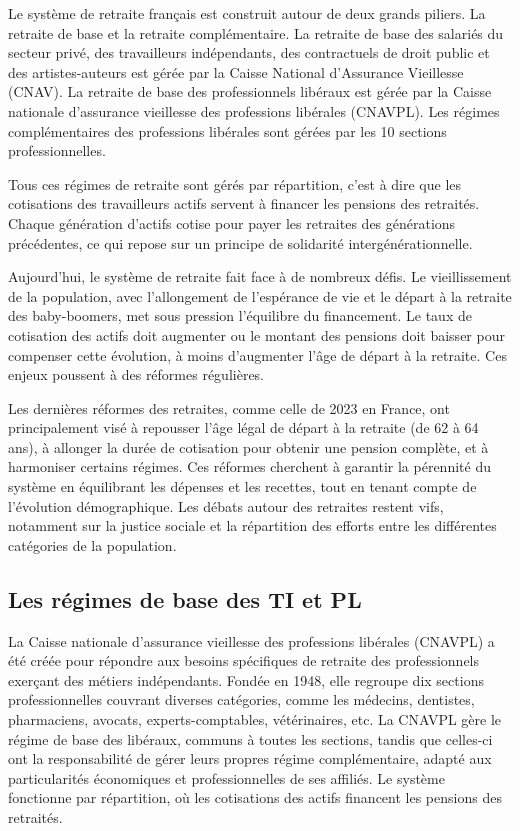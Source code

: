 Le système de retraite français est construit autour de deux grands piliers.
La retraite de base et la retraite complémentaire.
La retraite de base des salariés du secteur privé, des travailleurs indépendants, des contractuels de droit public et des artistes-auteurs est gérée par la Caisse National d'Assurance Vieillesse (CNAV). La retraite de base des professionnels libéraux est gérée par la Caisse nationale d'assurance vieillesse des professions libérales (CNAVPL).
Les régimes complémentaires des professions libérales sont gérées par les 10 sections professionnelles.

Tous ces régimes de retraite sont gérés par répartition, c'est à dire que les cotisations des travailleurs actifs servent à financer les pensions des retraités. Chaque génération d'actifs cotise pour payer les retraites des générations précédentes, ce qui repose sur un principe de solidarité intergénérationnelle. 

Aujourd'hui, le système de retraite fait face à de nombreux défis. Le vieillissement de la population, avec l'allongement de l'espérance de vie et le départ à la retraite des baby-boomers, met sous pression l'équilibre du financement. Le taux de cotisation des actifs doit augmenter ou le montant des pensions doit baisser pour compenser cette évolution, à moins d'augmenter l'âge de départ à la retraite. Ces enjeux poussent à des réformes régulières.

Les dernières réformes des retraites, comme celle de 2023 en France, ont principalement visé à repousser l'âge légal de départ à la retraite (de 62 à 64 ans), à allonger la durée de cotisation pour obtenir une pension complète, et à harmoniser certains régimes. Ces réformes cherchent à garantir la pérennité du système en équilibrant les dépenses et les recettes, tout en tenant compte de l'évolution démographique. Les débats autour des retraites restent vifs, notamment sur la justice sociale et la répartition des efforts entre les différentes catégories de la population.

\subsection{Les régimes de base des TI et PL}

La Caisse nationale d'assurance vieillesse des professions libérales (CNAVPL) a été créée pour répondre aux besoins spécifiques de retraite des professionnels exerçant des métiers indépendants. Fondée en 1948, elle regroupe dix sections professionnelles couvrant diverses catégories, comme les médecins, dentistes, pharmaciens, avocats, experts-comptables, vétérinaires, etc. La CNAVPL gère le régime de base des libéraux, communs à toutes les sections, tandis que celles-ci ont la responsabilité de gérer leurs propres régime complémentaire, adapté aux particularités économiques et professionnelles de ses affiliés. Le système fonctionne par répartition, où les cotisations des actifs financent les pensions des retraités.

